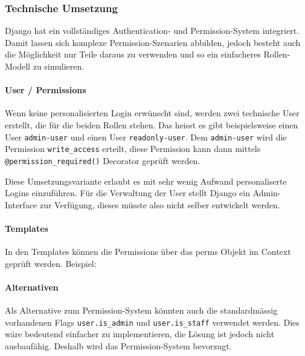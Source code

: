 \subsubsection{Technische Umsetzung}

Django hat ein vollständiges Authentication- und Permission-System integriert. Damit 
lassen sich komplexe Permission-Szenarien abbilden, jedoch besteht auch die Möglichkeit 
nur Teile daraus zu verwenden und so ein einfacheres Rollen-Modell zu simulieren.

\paragraph*{User / Permissions}

Wenn keine personalisierten Login erwünscht sind, werden zwei technische User
erstellt, die für die beiden Rollen stehen. Das heisst es gibt beispielsweise
einen User \texttt{admin-user} und einen User \texttt{readonly-user}. Dem
\texttt{admin-user} wird die Permission \texttt{write\_access} erteilt, diese
Permission kann dann mittels \texttt{@permission\_required()} Decorator geprüft
werden.

Diese Umsetzungsvariante erlaubt es mit sehr wenig Aufwand personaliserte Logins
einzuführen. Für die Verwaltung der User stellt Django ein Admin-Interface zur
Verfügung, dieses müsste also nicht selber entwickelt werden.

\paragraph*{Templates}

In den Templates können die Permissions über das perms Objekt im Context geprüft werden. 
Beispiel:


\paragraph*{Alternativen}

Als Alternative zum Permission-System könnten auch die standardmässig vorhandenen Flags 
\texttt{user.is\_admin} und \texttt{user.is\_staff} verwendet werden. Dies wäre bedeutend 
einfacher zu implementieren, die Lösung ist jedoch nicht ausbaufähig. Deshalb wird das 
Permission-System bevorzugt.



